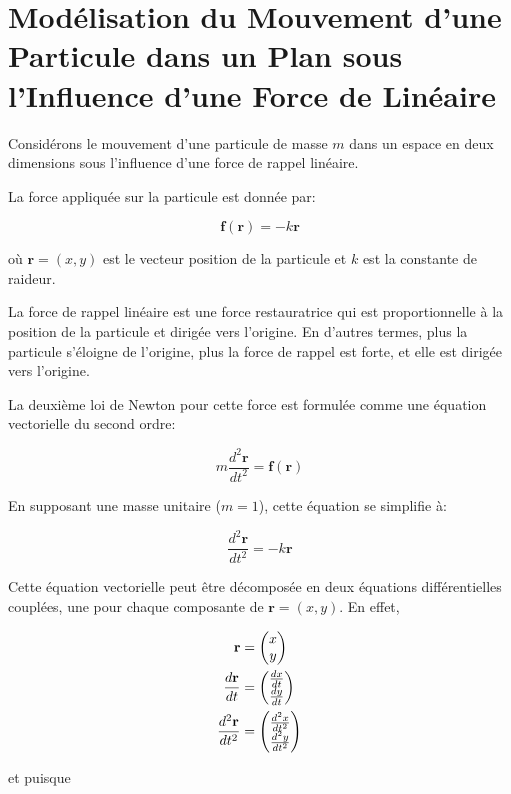 \documentclass[11pt]{article}
\begin{document}
\section*{Modélisation du Mouvement d'une Particule dans un Plan sous l'Influence d'une Force de Linéaire}
\label{sec:modele}


\noindent Considérons le mouvement d'une particule de masse \(m\) dans un espace en deux dimensions sous l'influence
d'une force de rappel linéaire.

\bigskip

\noindent La force appliquée sur la particule est donnée par:

\[
\mathbf{f}(\mathbf{r}) = -k \mathbf{r}
\]

\noindent où \(\mathbf{r} = (x, y)\) est le vecteur position de la particule et \(k\) est la constante de raideur.

\bigskip

\noindent La force de rappel linéaire est une force restauratrice qui est proportionnelle à la position de la particule et
dirigée vers l'origine.
En d'autres termes, plus la particule s'éloigne de l'origine, plus la force de rappel est forte,
et elle est dirigée vers l'origine.

\bigskip

\noindent La deuxième loi de Newton pour cette force est formulée comme une équation vectorielle du second ordre:

\[
m \frac{d^2\mathbf{r}}{dt^2} = \mathbf{f}(\mathbf{r})
\]

\noindent En supposant une masse unitaire (\(m = 1\)), cette équation se simplifie à:

\[
\frac{d^2\mathbf{r}}{dt^2} = -k \mathbf{r}
\]

\noindent Cette équation vectorielle peut être décomposée en deux équations différentielles couplées, une pour chaque
composante de \(\mathbf{r} = (x, y)\).
En effet,

\begin{align*}
    \mathbf{r} &= \mqty(x \\ y) \\
    \frac{d\mathbf{r}}{dt} &= \mqty(\frac{dx}{dt} \\ \frac{dy}{dt}) \\
    \frac{d^2\mathbf{r}}{dt^2} &= \mqty(\frac{d^2x}{dt^2} \\ \frac{d^2y}{dt^2})
\end{align*}

\noindent et puisque
\end{document}

